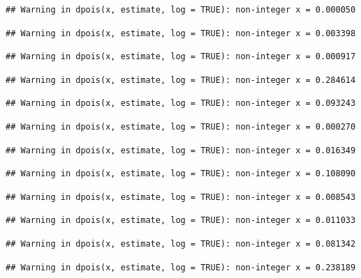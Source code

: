 \documentclass[]{article}
\begin{document}
\begin{verbatim}
## Warning in dpois(x, estimate, log = TRUE): non-integer x = 0.000050
\end{verbatim}

\begin{verbatim}
## Warning in dpois(x, estimate, log = TRUE): non-integer x = 0.003398
\end{verbatim}

\begin{verbatim}
## Warning in dpois(x, estimate, log = TRUE): non-integer x = 0.000917
\end{verbatim}

\begin{verbatim}
## Warning in dpois(x, estimate, log = TRUE): non-integer x = 0.284614
\end{verbatim}

\begin{verbatim}
## Warning in dpois(x, estimate, log = TRUE): non-integer x = 0.093243
\end{verbatim}

\begin{verbatim}
## Warning in dpois(x, estimate, log = TRUE): non-integer x = 0.000270
\end{verbatim}

\begin{verbatim}
## Warning in dpois(x, estimate, log = TRUE): non-integer x = 0.016349
\end{verbatim}

\begin{verbatim}
## Warning in dpois(x, estimate, log = TRUE): non-integer x = 0.108090
\end{verbatim}

\begin{verbatim}
## Warning in dpois(x, estimate, log = TRUE): non-integer x = 0.008543
\end{verbatim}

\begin{verbatim}
## Warning in dpois(x, estimate, log = TRUE): non-integer x = 0.011033
\end{verbatim}

\begin{verbatim}
## Warning in dpois(x, estimate, log = TRUE): non-integer x = 0.081342
\end{verbatim}

\begin{verbatim}
## Warning in dpois(x, estimate, log = TRUE): non-integer x = 0.238189
\end{verbatim}
\end{document}
